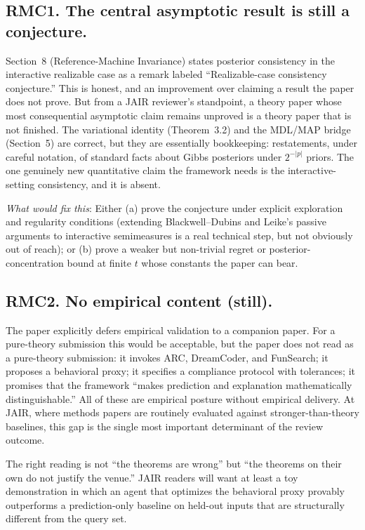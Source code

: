 \documentclass[11pt]{article}
\begin{document}
\subsection*{RMC1. The central asymptotic result is still a conjecture.}

Section~8 (Reference-Machine Invariance) states posterior consistency in the interactive realizable case as a remark labeled ``Realizable-case consistency conjecture.'' This is honest, and an improvement over claiming a result the paper does not prove. But from a JAIR reviewer's standpoint, a theory paper whose most consequential asymptotic claim remains unproved is a theory paper that is not finished. The variational identity (Theorem~3.2) and the MDL/MAP bridge (Section~5) are correct, but they are essentially bookkeeping: restatements, under careful notation, of standard facts about Gibbs posteriors under $2^{-|p|}$ priors. The one genuinely new quantitative claim the framework needs is the interactive-setting consistency, and it is absent.

\emph{What would fix this}: Either (a) prove the conjecture under explicit exploration and regularity conditions (extending Blackwell--Dubins and Leike's passive arguments to interactive semimeasures is a real technical step, but not obviously out of reach); or (b) prove a weaker but non-trivial regret or posterior-concentration bound at finite $t$ whose constants the paper can bear.

\subsection*{RMC2. No empirical content (still).}

The paper explicitly defers empirical validation to a companion paper. For a pure-theory submission this would be acceptable, but the paper does not read as a pure-theory submission: it invokes ARC, DreamCoder, and FunSearch; it proposes a behavioral proxy; it specifies a compliance protocol with tolerances; it promises that the framework ``makes prediction and explanation mathematically distinguishable.'' All of these are empirical posture without empirical delivery. At JAIR, where methods papers are routinely evaluated against stronger-than-theory baselines, this gap is the single most important determinant of the review outcome.

The right reading is not ``the theorems are wrong'' but ``the theorems on their own do not justify the venue.'' JAIR readers will want at least a toy demonstration in which an agent that optimizes the behavioral proxy provably outperforms a prediction-only baseline on held-out inputs that are structurally different from the query set.
\end{document}
